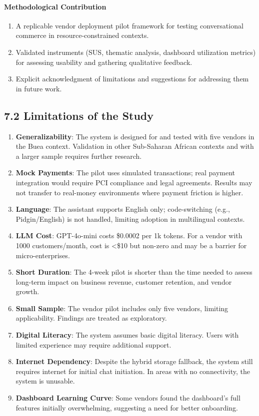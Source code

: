 \documentclass[12pt,a4paper]{article}
\begin{document}
\paragraph{Methodological Contribution}

\begin{enumerate}
    \item A replicable vendor deployment pilot framework for testing conversational commerce in resource-constrained contexts.
    \item Validated instruments (SUS, thematic analysis, dashboard utilization metrics) for assessing usability and gathering qualitative feedback.
    \item Explicit acknowledgment of limitations and suggestions for addressing them in future work.
\end{enumerate}

\subsection{7.2 Limitations of the Study}

\begin{enumerate}
    \item \textbf{Generalizability}: The system is designed for and tested with five vendors in the Buea context. Validation in other Sub-Saharan African contexts and with a larger sample requires further research.
    \item \textbf{Mock Payments}: The pilot uses simulated transactions; real payment integration would require PCI compliance and legal agreements. Results may not transfer to real-money environments where payment friction is higher.
    \item \textbf{Language}: The assistant supports English only; code-switching (e.g., Pidgin/English) is not handled, limiting adoption in multilingual contexts.
    \item \textbf{LLM Cost}: GPT-4o-mini costs \$0.0002 per 1k tokens. For a vendor with 1000 customers/month, cost is <\$10 but non-zero and may be a barrier for micro-enterprises.
    \item \textbf{Short Duration}: The 4-week pilot is shorter than the time needed to assess long-term impact on business revenue, customer retention, and vendor growth.
    \item \textbf{Small Sample}: The vendor pilot includes only five vendors, limiting applicability. Findings are treated as exploratory.
    \item \textbf{Digital Literacy}: The system assumes basic digital literacy. Users with limited experience may require additional support.
    \item \textbf{Internet Dependency}: Despite the hybrid storage fallback, the system still requires internet for initial chat initiation. In areas with no connectivity, the system is unusable.
    \item \textbf{Dashboard Learning Curve}: Some vendors found the dashboard's full features initially overwhelming, suggesting a need for better onboarding.
\end{enumerate}
\end{document}
